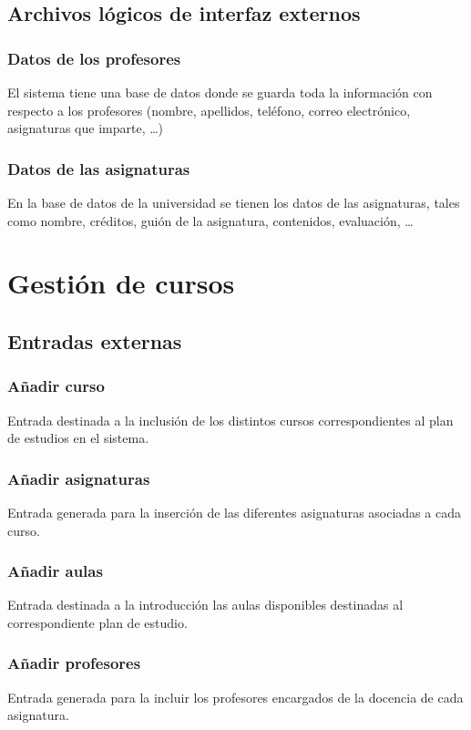 \documentclass[11pt,a4paper,spanish,twoside]{book}
\begin{document}
\subsection{Archivos lógicos de interfaz externos}
\subsubsection{Datos de los profesores}
El sistema tiene una base de datos donde se guarda toda la información con
respecto a los profesores (nombre, apellidos, teléfono, correo electrónico,
asignaturas que imparte, \dots)

\subsubsection{Datos de las asignaturas}
En la base de datos de la universidad se tienen los datos de las asignaturas,
tales como nombre, créditos, guión de la asignatura, contenidos, evaluación,
\dots 


\section{Gestión de cursos}
\subsection{Entradas externas}
\subsubsection{Añadir curso}
Entrada destinada a la inclusión de los distintos cursos correspondientes al
plan de estudios en el sistema.

\subsubsection{Añadir asignaturas}
Entrada generada para la inserción de las diferentes asignaturas asociadas a
cada curso.

\subsubsection{Añadir aulas}
Entrada destinada a la introducción las aulas disponibles destinadas al
correspondiente plan de estudio.

\subsubsection{Añadir profesores}
Entrada generada para la incluir los profesores encargados de la docencia de
cada asignatura.
\end{document}
